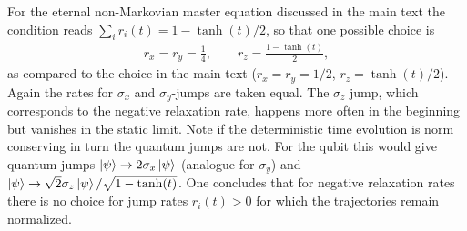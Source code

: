 \documentclass[twocolumn,prl,superscriptaddress]{revtex4-2}
\begin{document}
For the eternal non-Markovian master equation discussed in the main text the condition reads $\sum_i r_i(t) = 1 - \tanh(t)/2$, so that one possible choice is
\begin{align}
	r_x = r_y = \frac{1}{4}, \qquad r_z = \frac{1 - \tanh(t)}{2},
\end{align}
as compared to the choice in the main text ($r_x=r_y=1/2$, $r_z=\tanh(t)/2$). Again the rates for $\sigma_x$ and $\sigma_y$-jumps are taken equal. The $\sigma_z$ jump, which corresponds to the negative relaxation rate, happens more often in the beginning but vanishes in the static limit. Note if the deterministic time evolution is norm conserving in turn the quantum jumps are not. For the qubit this would give quantum jumps 
$\ket{\psi} \rightarrow 2 \sigma_x \ket{\psi}$ (analogue for $\sigma_y$) and $\ket{\psi} \rightarrow \sqrt 2 \sigma_z \ket{\psi}/\sqrt{1-\tanh(t)}$. One concludes that for negative relaxation rates there is no choice for jump rates $r_i(t)>0$ for which the trajectories remain normalized.
\end{document}
